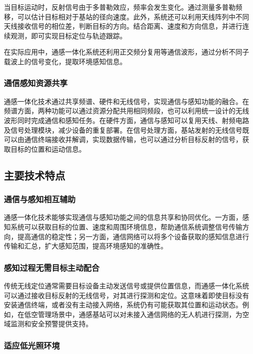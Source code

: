 \documentclass[12pt,a4paper,UTF8,fontset=fandol]{ctexart}
\begin{document}
当目标运动时，反射信号由于多普勒效应，频率会发生变化。通过测量多普勒频移，可以估计目标相对于基站的径向速度。此外，系统还可以利用天线阵列中不同天线接收信号的相位差，判断目标的方向。结合距离、速度和方向信息，并进行连续观测，即可实现目标定位与轨迹跟踪。

在实际应用中，通感一体化系统还利用正交频分复用等通信波形，通过分析不同子载波上的信号变化，提取环境感知信息。

\subsubsection{通信感知资源共享}

通感一体化技术通过共享频谱、硬件和无线信号，实现通信与感知功能的融合。在频谱方面，两种功能可以通过资源分配共用相同频段，也可以利用统一设计的无线波形同时完成通信和感知任务。在硬件方面，通信与感知可以复用天线、射频电路及信号处理模块，减少设备的重复部署。在信号处理方面，基站发射的无线信号既可以由通信终端接收并解调，实现数据传输，也可以通过分析目标反射的信号，获取目标的位置和运动信息。

\subsection{主要技术特点}

\subsubsection{通信与感知相互辅助}

通感一体化技术能够实现通信与感知功能之间的信息共享和协同优化。一方面，感知系统可以获取目标的位置、速度和周围环境信息，帮助通信系统调整信号传输方向，提高通信的稳定性；另一方面，通信网络可以将多个设备获取的感知信息进行传输和汇总，扩大感知范围，提高环境感知的准确性。

\subsubsection{感知过程无需目标主动配合}

传统无线定位通常需要目标设备主动发送信号或提供位置信息，而通感一体化系统可以通过接收目标反射的无线信号，对其进行探测和定位。这意味着即使目标没有安装通信终端，或者没有主动接入网络，系统仍有可能获取其位置和运动状态。例如，在低空管理场景中，通感基站可以对未接入通信网络的无人机进行探测，为空域监测和安全预警提供支持。

\subsubsection{适应低光照环境}
\end{document}
